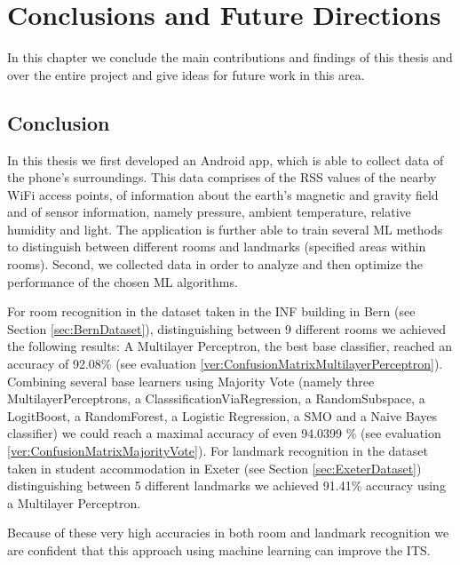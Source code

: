 
\chapter{Conclusions and Future Directions} %
\label{Chapter5} %



In this chapter we conclude the main contributions and findings of this thesis and over the entire project and give ideas for future work in this area. 


\section{Conclusion}
In this thesis we first developed an Android app, which is able to collect data of the phone's surroundings. This data comprises of the RSS values of the nearby WiFi access points, of information about the earth's magnetic and gravity field and of sensor information, namely pressure, ambient temperature, relative humidity and light. The application is further able to train several ML methods to distinguish between different rooms and landmarks (specified areas within rooms).
Second, we collected data in order to analyze and then optimize the performance of the chosen ML algorithms.

For room recognition in the dataset taken in the INF building in Bern (see Section \ref{sec:BernDataset}), distinguishing between 9 different rooms we achieved the following results:
A Multilayer Perceptron, the best base classifier, reached an accuracy of 92.08\% (see evaluation \ref{ver:ConfusionMatrixMultilayerPerceptron}). Combining several base learners using Majority Vote (namely three MultilayerPerceptrons, a ClasssificationViaRegression, a RandomSubspace, a LogitBoost, a RandomForest,  a Logistic Regression,  a SMO and a Naive Bayes classifier) we could reach a maximal accuracy of even 94.0399 \% (see evaluation \ref{ver:ConfusionMatrixMajorityVote}). For landmark recognition in the dataset taken in student accommodation in Exeter (see Section \ref{sec:ExeterDataset}) distinguishing between 5 different landmarks we achieved 91.41\% accuracy using a Multilayer Perceptron. 

Because of these very high accuracies in both room and landmark recognition we are confident that this approach using machine learning can improve the ITS. 

